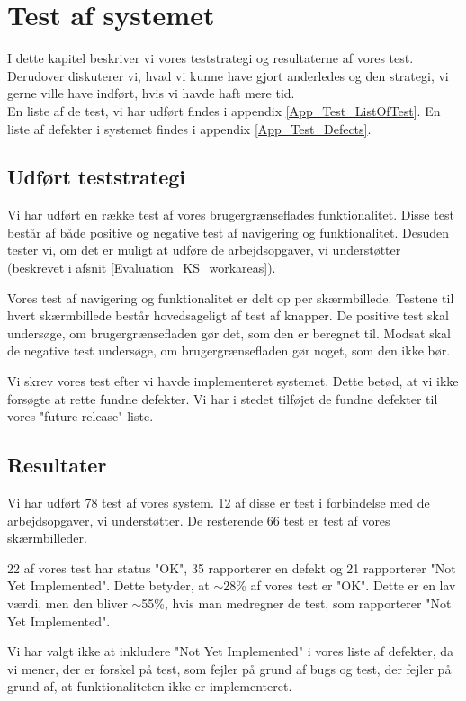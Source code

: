 \chapter{Test af systemet}
\label{Test}
I dette kapitel beskriver vi vores teststrategi og resultaterne af vores test. Derudover diskuterer vi, hvad vi kunne have gjort anderledes og den strategi, vi gerne ville have indført, hvis vi havde haft mere tid.
\\En liste af de test, vi har udført findes i appendix \ref{App_Test_ListOfTest}. En liste af defekter i systemet findes i appendix \ref{App_Test_Defects}.

\section{Udført teststrategi}
\label{Test_strat}
Vi har udført en række test af vores brugergrænseflades funktionalitet. Disse test består af både positive og negative test af navigering og funktionalitet. Desuden tester vi, om det er muligt at udføre de arbejdsopgaver, vi understøtter (beskrevet i afsnit \ref{Evaluation_KS_workareas}).

Vores test af navigering og funktionalitet er delt op per skærmbillede. Testene til hvert skærmbillede består hovedsageligt af test af knapper. De positive test skal undersøge, om brugergrænsefladen gør det, som den er beregnet til. Modsat skal de negative test undersøge, om brugergrænsefladen gør noget, som den ikke bør.

Vi skrev vores test efter vi havde implementeret systemet. Dette betød, at vi ikke forsøgte at rette fundne defekter. Vi har i stedet  tilføjet de fundne defekter til vores "future release"-liste.

\section{Resultater}
\label{Test_Results}
Vi har udført 78 test af vores system. 12 af disse er test i forbindelse med de arbejdsopgaver, vi understøtter. De resterende 66 test er test af vores skærmbilleder.

22 af vores test har status "OK", 35 rapporterer en defekt og 21 rapporterer "Not Yet Implemented". Dette betyder, at $\sim$28\% af vores test er "OK". Dette er en lav værdi, men den bliver $\sim$55\%, hvis man medregner de test, som rapporterer "Not Yet Implemented". 

Vi har valgt ikke at inkludere "Not Yet Implemented" i vores liste af defekter, da vi mener, der er forskel på test, som fejler på grund af bugs og test, der fejler på grund af, at funktionaliteten ikke er implementeret.

